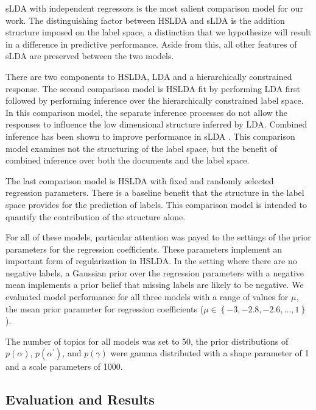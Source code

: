 sLDA with independent regressors is the most salient comparison model
for our work. The distinguishing factor between HSLDA and sLDA is the
addition structure imposed on the label space, a distinction that we
hypothesize will result in a difference in predictive performance. 
Aside from this, all other features of sLDA are preserved between the two models.

There are two components to HSLDA, LDA and a hierarchically constrained response.
The second comparison model is HSLDA fit by performing LDA first followed by
performing inference over the hierarchically constrained label space. In this
comparison model, the separate inference processes do not allow the responses
to influence the low dimensional structure inferred by LDA. Combined inference
has been shown to improve performance in sLDA \citep{BleiMcAuliffe2008}. This
comparison model examines not the structuring of the label space, but the benefit
of combined inference over both the documents and the label space.

The last comparison model is HSLDA with fixed and randomly selected regression
parameters. There is a baseline benefit that the structure in the label space 
provides for the prediction of labels. This comparison model is intended to
quantify the contribution of the structure alone.

For all of these models, particular attention was payed to the settings of the
prior parameters for the regression coefficients. These parameters implement an
important form of regularization in HSLDA. In the setting where there are no negative
labels, a Gaussian prior over the regression parameters with a negative mean implements
a prior belief that missing labels are likely to be negative. We evaluated model performance 
for all three models with a range of values for $\mu$, the mean prior parameter for regression coefficients
($\mu\in\left\{ -3,-2.8,-2.6,\ldots,1\right\}$).

The number of topics for all
models was set to 50, the prior distributions of
$p\left(\alpha\right)$, $p\left(\alpha^{\prime}\right)$, and $p\left(\gamma\right)$ were gamma distributed with a shape parameter of 1
and a scale parameters of 1000.


\subsection{Evaluation and Results}


